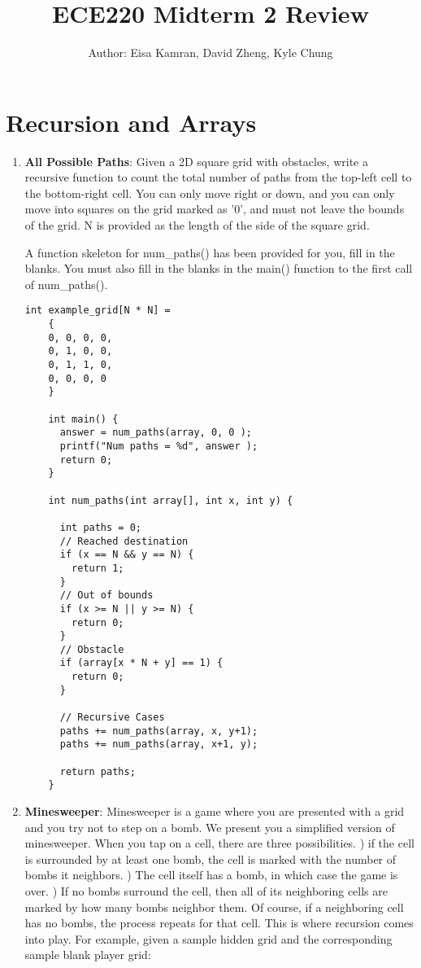 \documentclass{article}
\title{ECE220 Midterm 2 Review}
\author{Author: Eisa Kamran, David Zheng, Kyle Chung}
\begin{document}
\maketitle

\section{
    Recursion and Arrays
}

\begin{enumerate}[label=(\alph*)]
    \item \textbf{All Possible Paths}: Given a 2D square grid with obstacles, write a recursive function to count the total number of paths from the top-left cell to the bottom-right cell. You can only move right or down, and you can only move into squares on the grid marked as '0', and must not leave the bounds of the grid. N is provided as the length of the side of the square grid.
    
    A function skeleton for num\_paths() has been provided for you, fill in the blanks. You must also fill in the blanks in the main() function to the first call of num\_paths().

    \begin{lstlisting}[style=CStyle]
    int example_grid[N * N] = 
    {
    0, 0, 0, 0,
    0, 1, 0, 0,
    0, 1, 1, 0,
    0, 0, 0, 0 
    }
    
    int main() {
      answer = num_paths(array, 0, 0 );
      printf("Num paths = %d", answer );
      return 0;
    }
    
    int num_paths(int array[], int x, int y) {
      
      int paths = 0;
      // Reached destination
      if (x == N && y == N) {
        return 1;
      }
      // Out of bounds
      if (x >= N || y >= N) {
        return 0;
      }
      // Obstacle
      if (array[x * N + y] == 1) {
        return 0;
      }
      
      // Recursive Cases
      paths += num_paths(array, x, y+1);
      paths += num_paths(array, x+1, y);
    
      return paths;
    } \end{lstlisting}

    \item  \textbf{Minesweeper}: Minesweeper is a game where you are presented with a grid and you try not to step on a bomb. We present you a simplified version of minesweeper. When you tap on a cell, there are three possibilities. \newline {}) if the cell is surrounded by at least one bomb, the cell is marked with the number of bombs it neighbors. ) The cell itself has a bomb, in which case the game is over. ) If no bombs surround the cell, then all of its neighboring cells are marked by how many bombs neighbor them. Of course, if a neighboring cell has no bombs, the process repeats for that cell. This is where recursion comes into play. For example, given a sample hidden grid and the corresponding sample blank player grid: 
    \newline
    

\end{enumerate}
\end{document}
